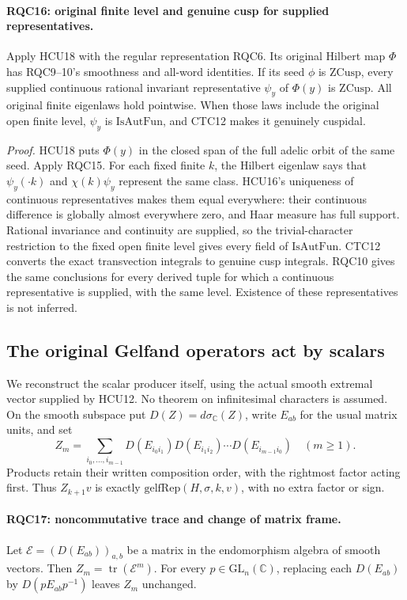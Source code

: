 \documentclass[11pt,a4paper]{article}
\numberwithin{equation}{section}
\theoremstyle{remark}\newtheorem{remark}[theorem]{Remark}
\begin{document}
\paragraph{RQC16: original finite level and genuine cusp for supplied representatives.}
\label{claim:RQC16}
Apply HCU18 with the regular representation RQC6.
Its original Hilbert map \(\Phi\) has RQC9--10's smoothness and
all-word identities.  If its seed \(\phi\) is \(\mathrm{ZCusp}\),
every supplied continuous rational invariant representative
\(\psi_y\) of \(\Phi(y)\) is \(\mathrm{ZCusp}\).
All original finite eigenlaws hold pointwise.  When those laws
include the original open finite level, \(\psi_y\) is
\(\mathrm{IsAutFun}\), and CTC12 makes it genuinely cuspidal.

\emph{Proof.}
HCU18 puts \(\Phi(y)\) in the closed span of the full adelic orbit
of the same seed.  Apply RQC15.  For each fixed finite \(k\), the
Hilbert eigenlaw says that \(\psi_y(\cdot k)\) and
\(\chi(k)\psi_y\) represent the same class.  HCU16's uniqueness of
continuous representatives makes them equal everywhere: their
continuous difference is globally almost everywhere zero, and
Haar measure has full support.  Rational invariance and continuity
are supplied, so the trivial-character restriction to the fixed
open finite level gives every field of \(\mathrm{IsAutFun}\).
CTC12 converts the exact transvection integrals to genuine cusp
integrals.  RQC10 gives the same conclusions for every derived tuple
for which a continuous representative is supplied, with the same
level.  Existence of these representatives is not inferred.

\subsection{The original Gelfand operators act by scalars}

We reconstruct the scalar producer itself, using the actual smooth
extremal vector supplied by HCU12.  No theorem on infinitesimal
characters is assumed.  On the smooth subspace put
\(D(Z)=d\sigma_{\mathbb C}(Z)\), write \(E_{ab}\) for the usual
matrix units, and set
\[
 Z_m=\sum_{i_0,\ldots,i_{m-1}}
 D(E_{i_0i_1})D(E_{i_1i_2})\cdots D(E_{i_{m-1}i_0})
 \quad(m\ge1).
 \tag{RQC.22}
\]
Products retain their written composition order, with the rightmost
factor acting first.  Thus \(Z_{k+1}v\) is exactly
\(\mathrm{gelfRep}(H,\sigma,k,v)\), with no extra factor or sign.

\paragraph{RQC17: noncommutative trace and change of matrix frame.}
\label{claim:RQC17}
Let \(\mathcal E=(D(E_{ab}))_{a,b}\) be a matrix in the
endomorphism algebra of smooth vectors.  Then
\(Z_m=\operatorname{tr}(\mathcal E^m)\).
For every \(p\in\mathrm{GL}_n(\mathbb C)\), replacing each
\(D(E_{ab})\) by \(D(pE_{ab}p^{-1})\) leaves \(Z_m\) unchanged.
\end{document}
